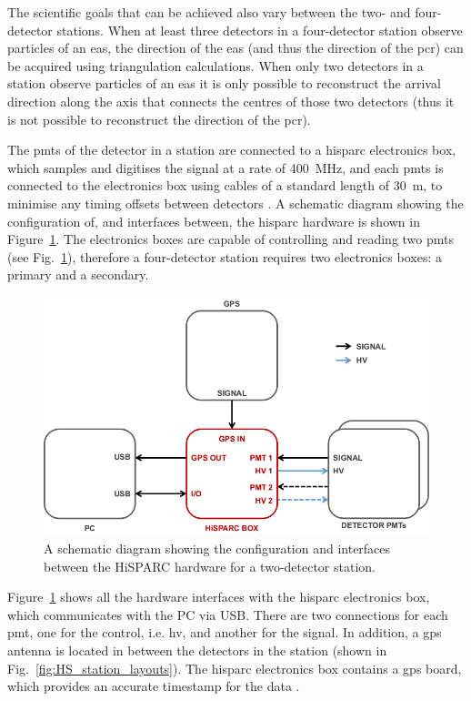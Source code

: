 The scientific goals that can be achieved also vary between the two- and four-detector stations. When at least three detectors in a four-detector station observe particles of an \gls{eas}, the direction of the \gls{eas} (and thus the direction of the \gls{pcr}) can be acquired using triangulation calculations. When only two detectors in a station observe particles of an \gls{eas} it is only possible to reconstruct the arrival direction along the axis that connects the centres of those two detectors (thus it is not possible to reconstruct the direction of the \gls{pcr}).

The \glspl{pmt} of the detector in a station are connected to a \gls{hisparc} electronics box, which samples and digitises the signal at a rate of 400~MHz, and each \glspl{pmt} is connected to the electronics box using cables of a standard length of 30~m, to minimise any timing offsets between detectors \citep{fokkema_hisparc_2012, van_dam_hisparc_2020}. A schematic diagram showing the configuration of, and interfaces between, the \gls{hisparc} hardware is shown in Figure~\ref{fig:HS_hardware_config}. The electronics boxes are capable of controlling and reading two \glspl{pmt} (see Fig.~\ref{fig:HS_hardware_config}), therefore a four-detector station requires two electronics boxes: a primary and a secondary.


\begin{figure}[ht!]
	\centering
	\includegraphics[width=\columnwidth]{HS_hardware_config.png}
	\caption{A schematic diagram showing the configuration and interfaces between the HiSPARC hardware for a two-detector station.}
	\label{fig:HS_hardware_config}
\end{figure}

Figure~\ref{fig:HS_hardware_config} shows all the hardware interfaces with the \gls{hisparc} electronics box, which communicates with the PC via USB. There are two connections for each \gls{pmt}, one for the control, i.e. \gls{hv}, and another for the signal. In addition, a \gls{gps} antenna is located in between the detectors in the station (shown in Fig.~\ref{fig:HS_station_layouts}). The \gls{hisparc} electronics box contains a \gls{gps} board, which provides an accurate timestamp for the data \citep{fokkema_hisparc_2012}.



